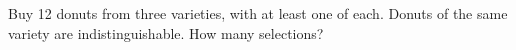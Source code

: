 Buy 12 donuts from three varieties, with at least one of each. Donuts of the same variety are indistinguishable. How many selections?

